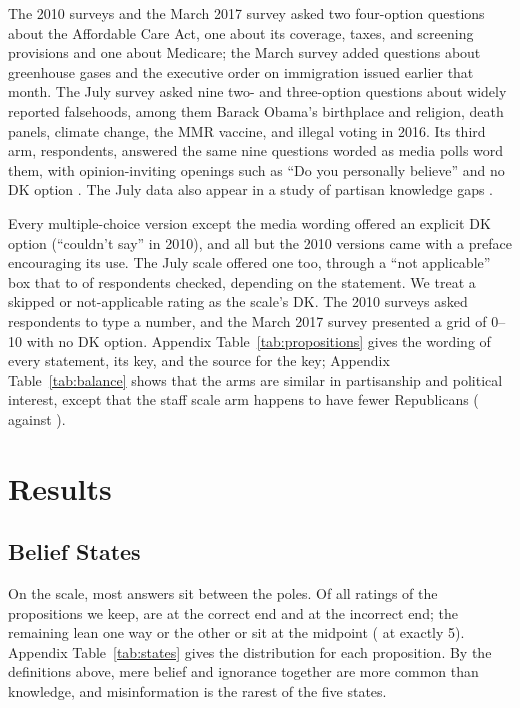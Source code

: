 \documentclass[11pt]{article}
\begin{document}
The 2010 surveys and the March 2017 survey asked two four-option questions about the Affordable Care Act, one about its coverage, taxes, and screening provisions and one about Medicare; the March survey added questions about greenhouse gases and the executive order on immigration issued earlier that month. The July survey asked nine two- and three-option questions about widely reported falsehoods, among them Barack Obama's birthplace and religion, death panels, climate change, the MMR vaccine, and illegal voting in 2016. Its third arm, \nJulyMedia{} respondents, answered the same nine questions worded as media polls word them, with opinion-inviting openings such as ``Do you personally believe'' and no DK option \citep{luskin2018}. The July data also appear in a study of partisan knowledge gaps \citep{shen2025}.

Every multiple-choice version except the media wording offered an explicit DK option (``couldn't say'' in 2010), and all but the 2010 versions came with a preface encouraging its use. The July scale offered one too, through a ``not applicable'' box that \julySkipMin{} to \julySkipMax{} of respondents checked, depending on the statement. We treat a skipped or not-applicable rating as the scale's DK. The 2010 surveys asked respondents to type a number, and the March 2017 survey presented a grid of 0--10 with no DK option. Appendix Table~\ref{tab:propositions} gives the wording of every statement, its key, and the source for the key; Appendix Table~\ref{tab:balance} shows that the arms are similar in partisanship and political interest, except that the staff scale arm happens to have fewer Republicans (\staffRepScale{} against \staffRepMc{}).

\section{Results}

\subsection{Belief States}

On the scale, most answers sit between the poles. Of all ratings of the \nPropositions{} propositions we keep, \shareKnowledge{} are at the correct end and \shareMisinformation{} at the incorrect end; the remaining \shareMiddle{} lean one way or the other or sit at the midpoint (\shareMidpoint{} at exactly 5). Appendix Table~\ref{tab:states} gives the distribution for each proposition. By the definitions above, mere belief and ignorance together are more common than knowledge, and misinformation is the rarest of the five states.
\end{document}
